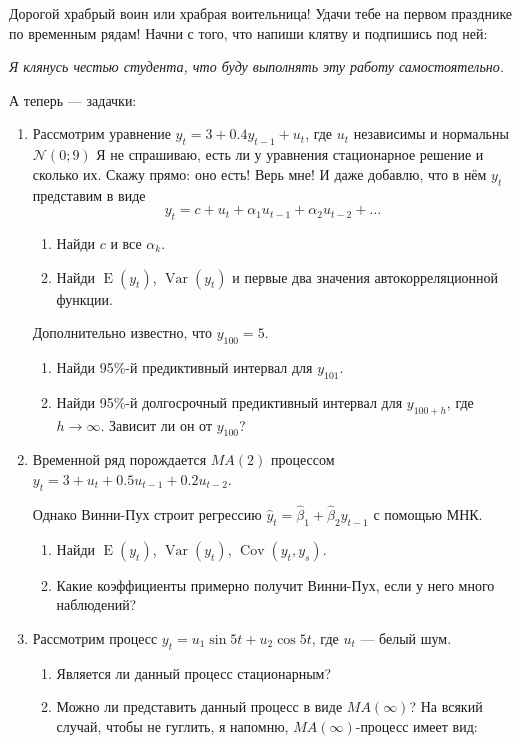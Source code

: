 \documentclass[12pt]{article}
\DeclareMathOperator{\Cov}{Cov}
\DeclareMathOperator{\Var}{Var}
\DeclareMathOperator{\E}{E}
\def \cN{\mathcal{N}}
\begin{document}
Дорогой храбрый воин или храбрая воительница! Удачи тебе на первом празднике по временным рядам!
Начни с того, что напиши клятву и подпишись под ней:

\vspace{10pt}
\textit{Я клянусь честью студента, что буду выполнять эту работу самостоятельно.}
\vspace{10pt}


А теперь — задачки:


\begin{enumerate}

\item Рассмотрим уравнение $y_t = 3 + 0.4y_{t-1} + u_t$, где $u_t$ независимы и нормальны $\cN(0; 9)$
Я не спрашиваю, есть ли у уравнения стационарное решение и сколько их.  
Скажу прямо: оно есть! Верь мне! И даже добавлю, что в нём $y_t$ представим в виде 
\[
	y_t = c + u_t + \alpha_1 u_{t-1} + \alpha_2 u_{t-2} + \ldots
\]

\begin{enumerate}
	\item Найди $c$ и все $\alpha_k$.
	\item Найди $\E(y_t)$, $\Var(y_t)$ и первые два значения автокорреляционной функции. 
\end{enumerate}
Дополнительно известно, что $y_{100}=5$.
\begin{enumerate}[resume]
	\item Найди 95\%-й предиктивный интервал для $y_{101}$. 
	\item Найди 95\%-й долгосрочный предиктивный интервал для $y_{100+h}$, 
	где $h \to \infty$. Зависит ли он от $y_{100}$?
\end{enumerate}
	


\item Временной ряд порождается $MA(2)$ процессом $y_t = 3 + u_t + 0.5u_{t-1} + 0.2 u_{t-2}$.

Однако Винни-Пух строит регрессию $\hat y_t = \hat\beta_1 + \hat\beta_2 y_{t-1}$ с помощью МНК.

\begin{enumerate}
	\item Найди $\E(y_t)$, $\Var(y_t)$, $\Cov(y_t, y_s)$.
	\item Какие коэффициенты примерно получит Винни-Пух, если у него много наблюдений?
\end{enumerate}


\item Рассмотрим процесс $y_t = u_1 \sin 5t + u_2 \cos 5t$, где $u_t$ — белый шум.
\begin{enumerate}
	\item Является ли данный процесс стационарным?
	\item Можно ли представить данный процесс в виде $MA(\infty)$? 
	На всякий случай, чтобы не гуглить, я напомню, $MA(\infty)$-процесс имеет вид:


\end{enumerate}
\end{enumerate}
\end{document}
